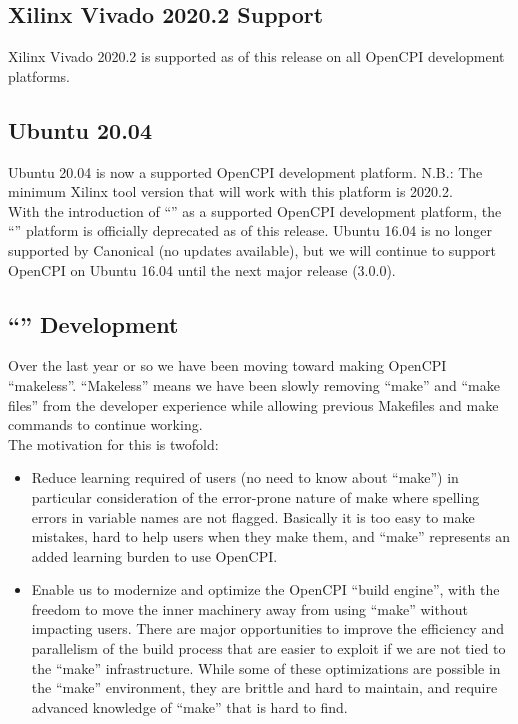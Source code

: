 \subsection{Xilinx Vivado 2020.2 Support}
Xilinx Vivado 2020.2 is supported as of this release on all OpenCPI development platforms.

\subsection{Ubuntu 20.04}
\label{sec:22_ubuntu20}
Ubuntu 20.04 is now a supported OpenCPI development platform.  N.B.: The minimum Xilinx tool version that will work with this platform is 2020.2.\\

With the introduction of ``'' as a supported OpenCPI development platform, the ``'' platform is officially deprecated as of this release.  Ubuntu 16.04 is no longer supported by Canonical (no updates available), but we will continue to support OpenCPI on Ubuntu 16.04 until the next major release (3.0.0).

\subsection{``'' Development}
\label{sec:22_makeless}
Over the last year or so we have been moving toward making OpenCPI ``makeless''.  ``Makeless'' means we have been slowly removing ``make'' and ``make files'' from the developer experience while allowing previous Makefiles and make commands to continue working.\\

The motivation for this is twofold:\\

\begin{itemize}
\setlength\itemsep{0em} %
\item Reduce learning required of users (no need to know about ``make'') in particular consideration of the error-prone nature of make where spelling errors in variable names are not flagged.  Basically it is too easy to make mistakes, hard to help users when they make them, and ``make'' represents an added learning burden to use OpenCPI.
\item Enable us to modernize and optimize the OpenCPI ``build engine'', with the freedom to move the inner machinery away from using ``make'' without impacting users.  There are major opportunities to improve the efficiency and parallelism of the build process that are easier to exploit if we are not tied to the ``make'' infrastructure.  While some of these optimizations are possible in the ``make'' environment, they are brittle and hard to maintain, and require advanced knowledge of ``make'' that is hard to find.
\end{itemize}

